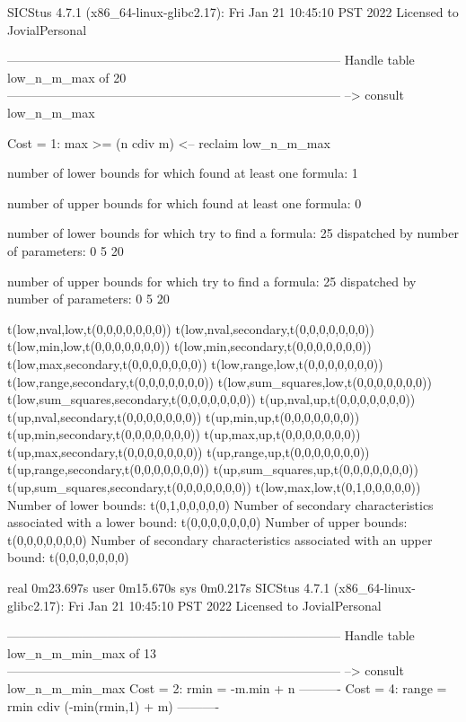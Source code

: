 SICStus 4.7.1 (x86_64-linux-glibc2.17): Fri Jan 21 10:45:10 PST 2022
Licensed to JovialPersonal


--------------------------------------------------------------------------------
Handle table low_n_m_max of 20
--------------------------------------------------------------------------------
--> consult low_n_m_max

Cost =  1:  max >= (n cdiv m)
<-- reclaim low_n_m_max

number of lower bounds for which found at least one formula: 1

number of upper bounds for which found at least one formula: 0

number of lower bounds for which try to find a formula: 25
dispatched by number of parameters: 0  5  20

number of upper bounds for which try to find a formula: 25
dispatched by number of parameters: 0  5  20

t(low,nval,low,t(0,0,0,0,0,0,0))
t(low,nval,secondary,t(0,0,0,0,0,0,0))
t(low,min,low,t(0,0,0,0,0,0,0))
t(low,min,secondary,t(0,0,0,0,0,0,0))
t(low,max,secondary,t(0,0,0,0,0,0,0))
t(low,range,low,t(0,0,0,0,0,0,0))
t(low,range,secondary,t(0,0,0,0,0,0,0))
t(low,sum_squares,low,t(0,0,0,0,0,0,0))
t(low,sum_squares,secondary,t(0,0,0,0,0,0,0))
t(up,nval,up,t(0,0,0,0,0,0,0))
t(up,nval,secondary,t(0,0,0,0,0,0,0))
t(up,min,up,t(0,0,0,0,0,0,0))
t(up,min,secondary,t(0,0,0,0,0,0,0))
t(up,max,up,t(0,0,0,0,0,0,0))
t(up,max,secondary,t(0,0,0,0,0,0,0))
t(up,range,up,t(0,0,0,0,0,0,0))
t(up,range,secondary,t(0,0,0,0,0,0,0))
t(up,sum_squares,up,t(0,0,0,0,0,0,0))
t(up,sum_squares,secondary,t(0,0,0,0,0,0,0))
t(low,max,low,t(0,1,0,0,0,0,0))
Number of lower bounds:                                             t(0,1,0,0,0,0,0)
Number of secondary characteristics associated with a lower bound:  t(0,0,0,0,0,0,0)
Number of upper bounds:                                             t(0,0,0,0,0,0,0)
Number of secondary characteristics associated with an upper bound: t(0,0,0,0,0,0,0)

real	0m23.697s
user	0m15.670s
sys	0m0.217s
SICStus 4.7.1 (x86_64-linux-glibc2.17): Fri Jan 21 10:45:10 PST 2022
Licensed to JovialPersonal


--------------------------------------------------------------------------------
Handle table low_n_m_min_max of 13
--------------------------------------------------------------------------------
--> consult low_n_m_min_max
Cost =  2:  rmin  = -m.min + n
----------
Cost =  4:  range = rmin cdiv (-min(rmin,1) + m)
----------

